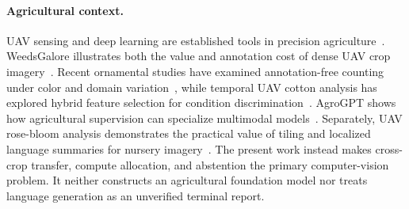 \paragraph{Agricultural context.}
UAV sensing and deep learning are established tools in precision agriculture~\cite{zhang2012uav,osco2021precision}. WeedsGalore illustrates both the value and annotation cost of dense UAV crop imagery~\cite{celikkan2025weedsgalore}. Recent ornamental studies have examined annotation-free counting under color and domain variation~\cite{manjunatha2026beyondgreen}, while temporal UAV cotton analysis has explored hybrid feature selection for condition discrimination~\cite{manjunatha2026agriqfs}. AgroGPT shows how agricultural supervision can specialize multimodal models~\cite{awais2025agrogpt}. Separately, UAV rose-bloom analysis demonstrates the practical value of tiling and localized language summaries for nursery imagery~\cite{sundaravadivel2026rosai}. The present work instead makes cross-crop transfer, compute allocation, and abstention the primary computer-vision problem. It neither constructs an agricultural foundation model nor treats language generation as an unverified terminal report.
